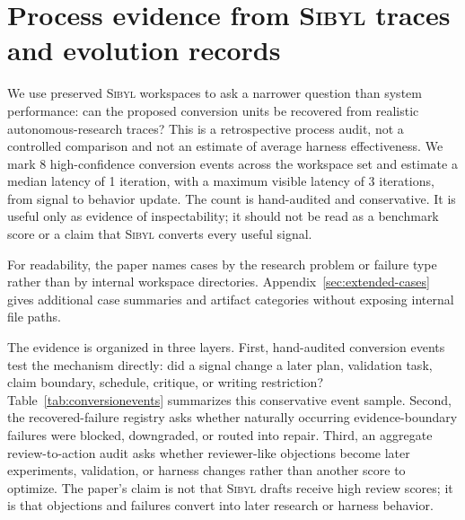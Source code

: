\documentclass{article}
\newcommand{\sibyl}{\textsc{Sibyl}}
\begin{document}
\section{Process evidence from \sibyl{} traces and evolution records}
\label{sec:process-evidence}

We use preserved \sibyl{} workspaces to ask a narrower question than system performance: can the proposed conversion units be recovered from realistic autonomous-research traces? This is a retrospective process audit, not a controlled comparison and not an estimate of average harness effectiveness. We mark 8 high-confidence conversion events across the workspace set and estimate a median latency of 1 iteration, with a maximum visible latency of 3 iterations, from signal to behavior update. The count is hand-audited and conservative. It is useful only as evidence of inspectability; it should not be read as a benchmark score or a claim that \sibyl{} converts every useful signal.

For readability, the paper names cases by the research problem or failure type rather than by internal workspace directories. Appendix~\ref{sec:extended-cases} gives additional case summaries and artifact categories without exposing internal file paths.

The evidence is organized in three layers. First, hand-audited conversion events test the mechanism directly: did a signal change a later plan, validation task, claim boundary, schedule, critique, or writing restriction? Table~\ref{tab:conversionevents} summarizes this conservative event sample. Second, the recovered-failure registry asks whether naturally occurring evidence-boundary failures were blocked, downgraded, or routed into repair. Third, an aggregate review-to-action audit asks whether reviewer-like objections become later experiments, validation, or harness changes rather than another score to optimize. The paper's claim is not that \sibyl{} drafts receive high review scores; it is that objections and failures convert into later research or harness behavior.
\end{document}
